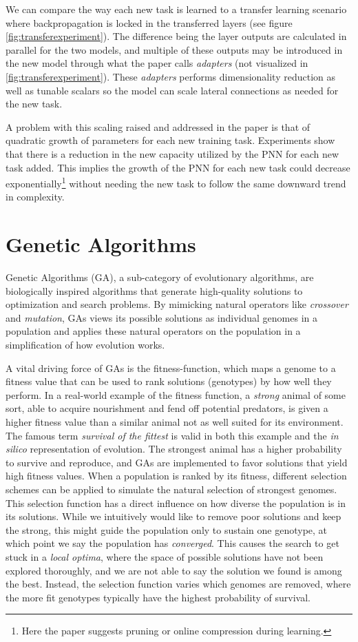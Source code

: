We can compare the way each new task is learned to a transfer learning scenario where backpropagation is locked in the transferred layers (see figure \ref{fig:transferexperiment}). The difference being the layer outputs are calculated in parallel for the two models, and multiple of these outputs may be introduced in the new model through what the paper calls \textit{adapters} (not visualized in \ref{fig:transferexperiment}). These \textit{adapters} performs dimensionality reduction as well as tunable scalars so the model can scale lateral connections as needed for the new task.

A problem with this scaling raised and addressed in the paper is that of quadratic growth of parameters for each new training task. Experiments show that there is a reduction in the new capacity utilized by the PNN for each new task added. This implies the growth of the PNN for each new task could decrease exponentially\footnote{Here the paper suggests pruning or online compression during learning.} without needing the new task to follow the same downward trend in complexity. 

\section{Genetic Algorithms}
\label{background:GA}
Genetic Algorithms (GA), a sub-category of evolutionary algorithms,  are biologically inspired algorithms that generate high-quality solutions to optimization and search problems. By mimicking natural operators like \textit{crossover} and \textit{mutation}, GAs views its possible solutions as individual genomes in a population and applies these natural operators on the population in a simplification of how evolution works. 

A vital driving force of GAs is the fitness-function, which maps a genome to a fitness value that can be used to rank solutions (genotypes) by how well they perform. In a real-world example of the fitness function, a \textit{strong} animal of some sort, able to acquire nourishment and fend off potential predators, is given a higher fitness value than a similar animal not as well suited for its environment. The famous term \textit{survival of the fittest} is valid in both this example and the \textit{in silico} representation of evolution. The strongest animal has a higher probability to survive and reproduce, and GAs are implemented to favor solutions that yield high fitness values.  
When a population is ranked by its fitness, different selection schemes can be applied to simulate the natural selection of strongest genomes. This selection function has a direct influence on how diverse the population is in its solutions. While we intuitively would like to remove poor solutions and keep the strong, this might guide the population only to sustain one genotype, at which point we say the population has \textit{converged}. This causes the search to get stuck in a \textit{local optima}, where the space of possible solutions have not been explored thoroughly, and we are not able to say the solution we found is among the best. Instead, the selection function varies which genomes are removed, where the more fit genotypes typically have the highest probability of survival. 

